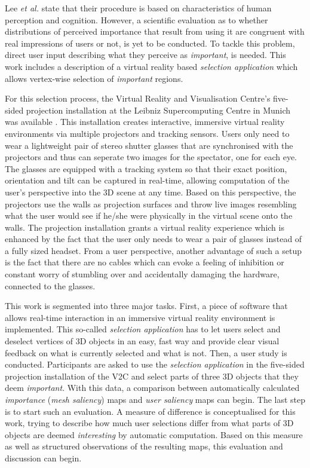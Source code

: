Lee \textit{et al.} state that their procedure is based on characteristics of human perception and cognition. However, a scientific evaluation as to whether distributions of perceived importance that result from using it are congruent with real impressions of users or not, is yet to be conducted. To tackle this problem, direct user input describing what they perceive as \textit{important}, is needed. This work includes a description of a virtual reality based \textit{selection application} which allows vertex-wise selection of \textit{important} regions.

For this selection process, the Virtual Reality and Visualisation Centre's five-sided projection installation at the Leibniz Supercomputing Centre in Munich was available \cite{v2c}. This installation creates interactive, immersive virtual reality environments via multiple projectors and tracking sensors. Users only need to wear a lightweight pair of stereo shutter glasses that are synchronised with the projectors and thus can seperate two images for the spectator, one for each eye. The glasses are equipped with a tracking system so that their exact position, orientation and tilt can be captured in real-time, allowing computation of the user's perspective into the 3D scene at any time. Based on this perspective, the projectors use the walls as projection surfaces and throw live images resembling what the user would see if he/she were physically in the virtual scene onto the walls. The projection installation grants a virtual reality experience which is enhanced by the fact that the user only needs to wear a pair of glasses instead of a fully sized headset. From a user perspective, another advantage of such a setup is the fact that there are no cables which can evoke a feeling of inhibition or constant worry of stumbling over and accidentally damaging the hardware, connected to the glasses.

This work is segmented into three major tasks. First, a piece of software that allows real-time interaction in an immersive virtual reality environment is implemented. This so-called \textit{selection application} has to let users select and deselect vertices of 3D objects in an easy, fast way and provide clear visual feedback on what is currently selected and what is not. Then, a user study is conducted. Participants are asked to use the \textit{selection application} in the five-sided projection installation of the V2C \cite{v2c} and select parts of three 3D objects that they deem \textit{important}. With this data, a comparison between automatically calculated \textit{importance} (\textit{mesh saliency}) maps and \textit{user saliency} maps can begin. The last step is to start such an evaluation. A measure of difference is conceptualised for this work, trying to describe how much user selections differ from what parts of 3D objects are deemed \textit{interesting} by automatic computation. Based on this measure as well as structured observations of the resulting maps, this evaluation and discussion can begin.

